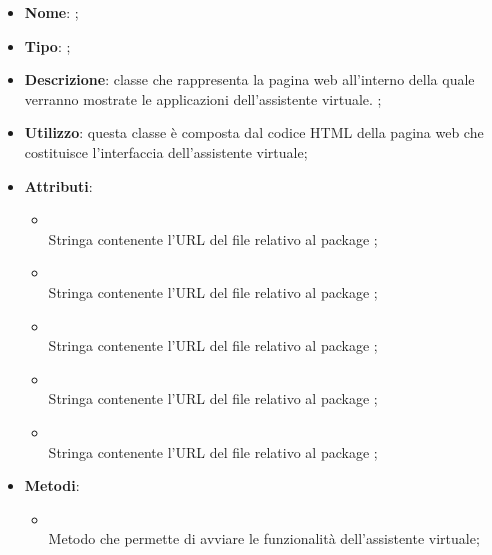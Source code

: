 \begin{itemize}
	\item \textbf{Nome}: ;
	\item \textbf{Tipo}: ;
	\item \textbf{Descrizione}: classe che rappresenta la pagina web all'interno della quale verranno mostrate le applicazioni dell'assistente virtuale. ;
	\item \textbf{Utilizzo}: questa classe è composta dal codice HTML della pagina web che costituisce l'interfaccia dell'assistente virtuale;
	\item \textbf{Attributi}:
	\begin{itemize}
		\item[]  \\
		Stringa contenente l'URL del file relativo al package ;
		\item[]  \\
		Stringa contenente l'URL del file relativo al package ;
		\item[]  \\
		Stringa contenente l'URL del file relativo al package ;
		\item[]  \\
		Stringa contenente l'URL del file relativo al package ;
		\item[]  \\
		Stringa contenente l'URL del file relativo al package ;
	\end{itemize}
	\item \textbf{Metodi}:
	\begin{itemize}
		\item[]  \\
		Metodo che permette di avviare le funzionalità dell'assistente virtuale;\\
	\end{itemize}
\end{itemize}
\FloatBarrier

